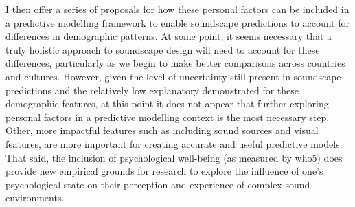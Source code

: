 I then offer a series of proposals for how these personal factors can be included in a predictive modelling framework to enable soundscape predictions to account for differences in demographic patterns. At some point, it seems necessary that a truly holistic approach to soundscape design will need to account for these differences, particularly as we begin to make better comparisons across countries and cultures. However, given the level of uncertainty still present in soundscape predictions and the relatively low explanatory demonstrated for these demographic features, at this point it does not appear that further exploring personal factors in a predictive modelling context is the most necessary step. Other, more impactful features such as including sound sources and visual features, are more important for creating accurate and useful predictive models. That said, the inclusion of psychological well-being (as measured by \gls{who5}) does provide new empirical grounds for research to explore the influence of one's psychological state on their perception and experience of complex sound environments.
